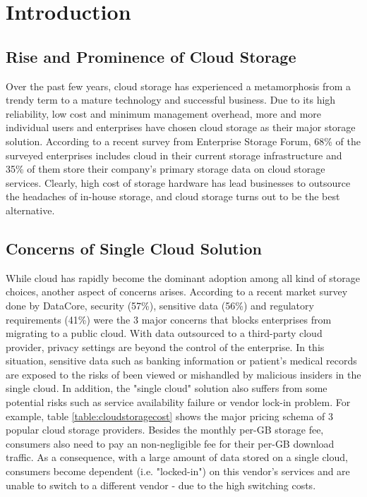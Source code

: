 \chapter{Introduction}
\label{c:intro}

\section{Rise and Prominence of Cloud Storage}
\label{s:riseandprominenceofcloudstorage}
Over the past few years, cloud storage has experienced a metamorphosis from a trendy term to a mature technology and successful business. Due to its high reliability, low cost and minimum management overhead, more and more individual users and enterprises have chosen cloud storage as their major storage solution. According to a recent survey from Enterprise Storage Forum\cite{storagetrends2018}, 68\% of the surveyed enterprises includes cloud in their current storage infrastructure and 35\% of them store their company's primary storage data on cloud storage services. Clearly, high cost of storage hardware has lead businesses to outsource the headaches of in-house storage, and cloud storage turns out to be the best alternative.

\newpage

\section{Concerns of Single Cloud Solution}
\label{s:concernsofsinglecloudsolution}
While cloud has rapidly become the dominant adoption among all kind of storage choices, another aspect of concerns arises. According to a recent market survey done by DataCore\cite{datacore2017survey}, security (57\%), sensitive data (56\%) and regulatory requirements (41\%) were the 3 major concerns that blocks enterprises from migrating to a public cloud. With data outsourced to a third-party cloud provider, privacy settings are beyond the control of the enterprise. In this situation, sensitive data such as banking information or patient's medical records are exposed to the risks of been viewed or mishandled by malicious insiders in the single cloud. In addition, the "single cloud" solution also suffers from some potential risks such as service availability failure or vendor lock-in problem. For example, table \ref{table:cloudstoragecost} shows the major pricing schema of 3 popular cloud storage providers. Besides the monthly per-GB storage fee, consumers also need to pay an non-negligible fee for their per-GB download traffic. As a consequence, with a large amount of data stored on a single cloud, consumers become dependent (i.e. "locked-in") on this vendor's services and are unable to switch to a different vendor - due to the high switching costs.

